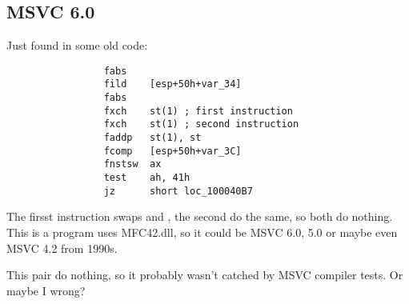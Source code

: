 \subsection{MSVC 6.0}

Just found in some old code:

\begin{lstlisting}
                 fabs
                 fild    [esp+50h+var_34]
                 fabs
                 fxch    st(1) ; first instruction
                 fxch    st(1) ; second instruction
                 faddp   st(1), st
                 fcomp   [esp+50h+var_3C]
                 fnstsw  ax
                 test    ah, 41h
                 jz      short loc_100040B7
\end{lstlisting}

The firsst  instruction swaps  and , the second do the same, so both do nothing.
This is a program uses MFC42.dll, so it could be MSVC 6.0, 5.0 or maybe even MSVC 4.2 from 1990s.

This pair do nothing, so it probably wasn't catched by MSVC compiler tests.
Or maybe I wrong?

